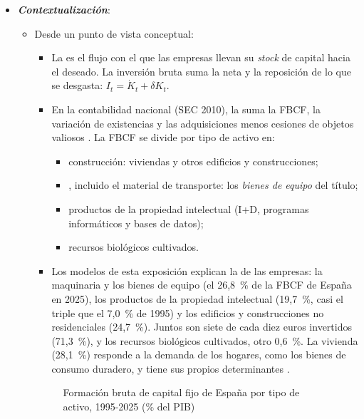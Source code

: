 \documentclass[11pt]{article}
\begin{document}
\begin{itemize}
\item \textbf{\emph{Contextualización}}:
  \begin{itemize}
  \item Desde un punto de vista conceptual:
  \begin{itemize}
  \item La  es el flujo con el que las empresas llevan su \emph{stock} de capital hacia el deseado. La inversión bruta suma la neta y la reposición de lo que se desgasta: $I_t=\dot K_t+\delta K_t$.
  \item En la contabilidad nacional (SEC 2010), la  suma la FBCF, la variación de existencias y las adquisiciones menos cesiones de objetos valiosos\nocite{RegUE2013SEC2010} . La FBCF se divide por tipo de activo en:
    \begin{itemize}
    \item construcción: viviendas y otros edificios y construcciones;
    \item {}, incluido el material de transporte: los \emph{bienes de equipo} del título;
    \item productos de la propiedad intelectual (I+D, programas informáticos y bases de datos);
    \item recursos biológicos cultivados.
    \end{itemize}
  \item Los modelos de esta exposición explican la  de las empresas: la maquinaria y los bienes de equipo (el 26,8~\% de la FBCF de España en 2025), los productos de la propiedad intelectual (19,7~\%, casi el triple que el 7,0~\% de 1995) y los edificios y construcciones no residenciales (24,7~\%). Juntos son siete de cada diez euros invertidos (71,3~\%)\nocite{INE2026CNTRActivos}, y los recursos biológicos cultivados, otro 0,6~\%. La vivienda (28,1~\%) responde a la demanda de los hogares, como los bienes de consumo duradero, y tiene sus propios determinantes .
  \end{itemize}
  \begin{figure}[H]
  \centering
  \caption{Formación bruta de capital fijo de España por tipo de activo, 1995-2025 (\% del PIB)}\label{fig:fbcf-activos}
  \end{figure}

\end{itemize}
\end{itemize}
\end{document}
